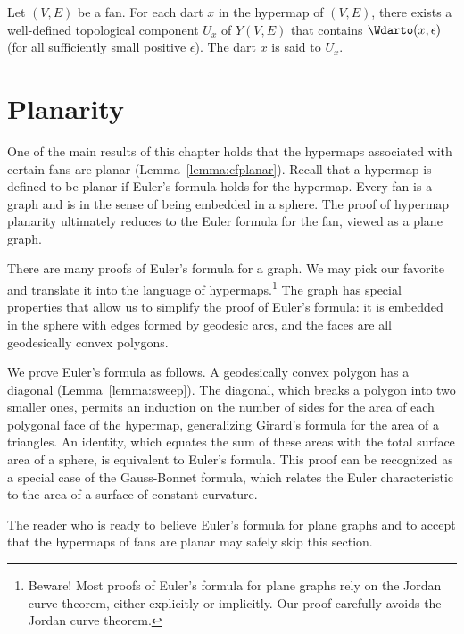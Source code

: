 \begin{definition}
  Let $(V,E)$ be a fan.  For each dart $x$ in the hypermap of $(V,E)$,
  there exists a well-defined topological component $U_x$ of $Y(V,E)$
  that contains $\Wdarto(x,\epsilon)$ (for all sufficiently small
  positive $\epsilon$). The dart $x$ is said to  $U_x$.
\end{definition}
%


\section{Planarity}

One of the main results of this chapter holds that the hypermaps
associated with certain fans are planar (Lemma~\ref{lemma:cfplanar}).
Recall that a hypermap is defined to be planar if Euler's formula
holds for the hypermap.  Every fan is a graph and is  in
the sense of being embedded in a sphere.  The proof of hypermap
planarity ultimately reduces to the Euler formula for the fan, viewed
as a plane graph.

There are many proofs of Euler's formula for a graph.  We may pick our
favorite and translate it into the language of
hypermaps.\footnote{Beware!  Most proofs of Euler's formula for plane
  graphs rely on the Jordan curve theorem, either explicitly or
  implicitly.  Our proof carefully avoids the Jordan curve theorem.}
The graph has special properties that allow us to simplify the proof
of Euler's formula: it is embedded in the sphere with edges formed by
geodesic arcs, and the faces are all geodesically convex polygons.

We prove Euler's formula as follows.  A geodesically convex polygon
has a diagonal (Lemma~\ref{lemma:sweep}).  The diagonal, which breaks
a polygon into two smaller ones, permits an induction on the number of
sides for the area of each polygonal face of the hypermap,
generalizing Girard's formula for the area of a triangles.  An identity, which
equates the sum of these areas with the total surface area of a sphere, is
equivalent to Euler's formula.  This proof can be recognized as a special
case of the Gauss-Bonnet formula, which relates the Euler characteristic to
the area of a surface of constant curvature.


The reader who is ready to believe Euler's formula for plane graphs
and to accept that the hypermaps of fans are planar may safely skip
this section.

